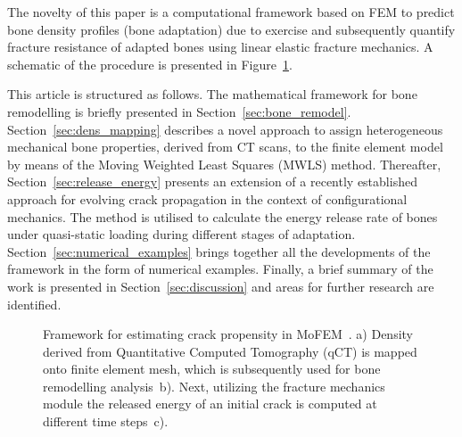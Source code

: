 \documentclass[11pt]{acmeArticle}
\numberwithin{equation}{section}
\begin{document}
The novelty of this paper is a computational framework based on FEM to predict bone density profiles 
(bone adaptation) due to exercise and subsequently quantify fracture resistance of 
adapted bones using linear elastic fracture mechanics. 
A schematic of the procedure is presented in Figure~\ref{fig:framework}.

This article is structured as follows. The mathematical framework for bone remodelling is briefly presented in Section~\ref{sec:bone_remodel}.
Section~\ref{sec:dens_mapping} describes a novel approach to assign heterogeneous mechanical bone properties, derived from CT scans,
to the finite element model by means of the Moving Weighted Least Squares (MWLS) method.
Thereafter, Section~\ref{sec:release_energy} presents an extension of a recently established approach 
for evolving crack propagation in the context of configurational mechanics. The method is utilised to calculate the energy release rate of bones under quasi-static loading during different stages of adaptation. 
Section~\ref{sec:numerical_examples} brings together all the developments of the framework in the form of numerical examples. 
Finally, a brief summary of the work is presented in Section~\ref{sec:discussion} and areas for further research are identified.

\begin{figure}[h]
	\centering
\caption{Framework for estimating crack propensity in MoFEM~\citep{mofem2017}. a) Density derived from Quantitative Computed Tomography (qCT) is mapped onto finite element mesh, which is subsequently used for bone remodelling analysis~b). 
Next, utilizing the fracture mechanics module the released energy of an initial crack is computed at different time steps~c).}
\label{fig:framework}
\end{figure}
\end{document}
